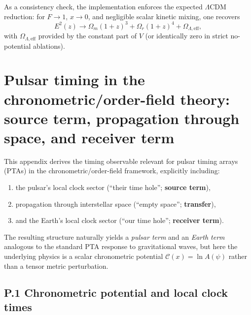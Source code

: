 \documentclass[10pt]{article}
\begin{document}
As a consistency check, the implementation enforces the expected $\Lambda$CDM reduction:
for $F\!\to\!1$, $x\!\to\!0$, and negligible scalar kinetic mixing, one recovers
\begin{equation}
E^2(z) \to \Omega_m(1+z)^3 + \Omega_r(1+z)^4 + \Omega_{\Lambda,\mathrm{eff}},
\end{equation}
with $\Omega_{\Lambda,\mathrm{eff}}$ provided by the constant part of $V$ (or identically zero in
strict no-potential ablations).



\section{Pulsar timing in the chronometric/order-field theory:
source term, propagation through space, and receiver term}
\label{app:pta_full}

This appendix derives the timing observable relevant for pulsar timing arrays (PTAs) in the
chronometric/order-field framework, explicitly including:
\begin{enumerate}[leftmargin=1.2em]
\item the pulsar's local clock sector (``their time hole''; \textbf{source term}),
\item propagation through interstellar space (``empty space''; \textbf{transfer}),
\item and the Earth's local clock sector (``our time hole''; \textbf{receiver term}).
\end{enumerate}
The resulting structure naturally yields a \emph{pulsar term} and an \emph{Earth term} analogous to
the standard PTA response to gravitational waves, but here the underlying physics is a scalar
chronometric potential $\mathcal{C}(x)=\ln A(\psi)$ rather than a tensor metric perturbation.

\subsection{P.1 Chronometric potential and local clock times}
\label{app:pta:clock_times}
\end{document}

